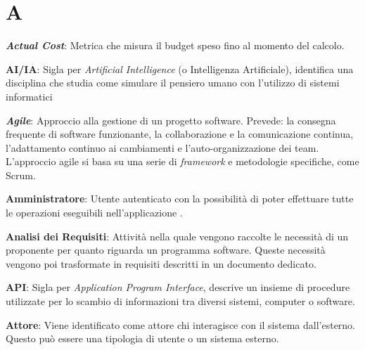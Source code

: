 \documentclass[5pt]{article}
\begin{document}
\section*{A}
\begin{flushleft}
	
\textbf{\textit{Actual Cost}}: Metrica che misura il budget speso fino al momento del calcolo.\newline

\textbf{AI/IA}: Sigla per \textit{Artificial Intelligence} (o Intelligenza Artificiale), identifica una disciplina che studia come simulare il pensiero umano con l'utilizzo di sistemi informatici\newline

\textbf{\textit{Agile}}: Approccio alla gestione di un progetto software. Prevede: la consegna frequente di software funzionante, la collaborazione e la comunicazione continua, l'adattamento continuo ai cambiamenti e l'auto-organizzazione dei team. L'approccio agile si basa su una serie di \textit{framework} e metodologie specifiche, come Scrum.\newline

\textbf{Amministratore}: Utente autenticato con la possibilità di poter effettuare tutte le operazioni eseguibili nell'applicazione . \newline

\textbf{Analisi dei Requisiti}: Attività nella quale vengono raccolte le necessità di un proponente per quanto riguarda un programma software. Queste necessità vengono poi trasformate in requisiti descritti in un documento dedicato. \newline

\textbf{API}: Sigla per \textit{Application Program Interface}, descrive un insieme di procedure utilizzate per lo scambio di informazioni tra diversi sistemi, computer o software. \newline

\textbf{Attore}: Viene identificato come attore chi interagisce con il sistema dall'esterno. Questo può essere una tipologia di utente o un sistema esterno. 

\end{flushleft}
\end{document}
